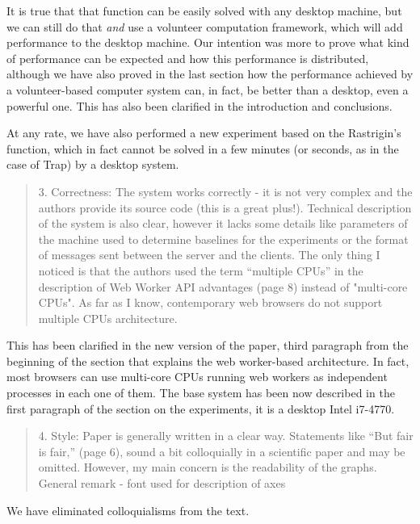\documentclass[preprint]{elsarticle}
\begin{document}
It is true that that function can be easily solved with any desktop
machine, but we can still do that {\em and} use a volunteer
computation framework, which will add performance to the desktop
machine. Our intention was more to prove what kind of performance can
be expected and how this performance is distributed, although we have
also proved in the last section how the performance achieved by a
volunteer-based computer system can, in fact, be better than a desktop, even
a powerful one. This has also been clarified in the introduction and
conclusions. 

At any rate, we have also performed a new experiment based on the
Rastrigin's function, which in fact cannot be solved in a few minutes
(or seconds, as in the case of Trap) by a desktop system. 


\begin{quote}
3. Correctness: The system works correctly - it is not very complex and the authors provide its source
code (this is a great plus!). Technical description of the system is also clear, however it lacks some
details like parameters of the machine used to determine baselines for the experiments or the format of
messages sent between the server and the clients. The only thing I noticed is that the authors used the
term ``multiple CPUs'' in the description of Web Worker API advantages (page 8) instead of "multi-core
CPUs". As far as I know, contemporary web browsers do not support
multiple CPUs architecture.
\end{quote}

This has been clarified in the new version of the paper, third
paragraph from the beginning of the section that explains the web
worker-based architecture. In fact, most browsers can use multi-core
CPUs running web workers as independent processes in each one of them.
The base system has been now described in the first paragraph of the
section on the experiments, it is a desktop Intel i7-4770. 

\begin{quote}

4. Style: Paper is generally written in a clear way. Statements like
``But fair is fair,'' (page 6), sound a bit colloquially in a scientific
paper and may be omitted. However, my main concern is the readability
of the graphs. General remark - font used for description of axes

\end{quote}

We have eliminated colloquialisms from the text.
\end{document}
